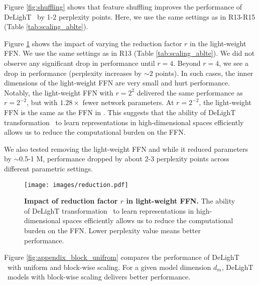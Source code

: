 \vspace{1mm}
 Figure \ref{fig:shuffling} shows that feature shuffling improves the performance of DeLighT ~by 1-2 perplexity points. Here, we use the same settings as in R13-R15 (Table \ref{tab:scaling_ablte}).

\vspace{1mm}
 Figure \ref{fig:reduction_fac} shows the impact of varying the reduction factor $r$ in the light-weight FFN. We use the same settings as in R13 (Table \ref{tab:scaling_ablte}). We did not observe any significant drop in performance until $r=4$. Beyond $r=4$, we see a drop in performance (perplexity increases by ${\sim}2$ points). In such cases, the inner dimensions of the light-weight FFN are very small and hurt performance. Notably, the light-weight FFN with $r=2^2$ delivered the same performance as $r=2^{-2}$, but with $1.28\times$ fewer network parameters. At $r=2^{-2}$, the light-weight FFN is the same as the FFN in \cite{vaswani2017attention}. This suggests that the ability of DeLighT transformation ~to learn representations in high-dimensional spaces efficiently allows us to reduce the computational burden on the FFN. 

We also tested removing the light-weight FFN and while it reduced parameters by $\sim$0.5-1 M, performance dropped by about 2-3 perplexity points across different parametric settings.

\begin{figure}[t!]
    \centering
    \texttt{[image: images/reduction.pdf]}
    \caption{\textbf{Impact of reduction factor $r$ in light-weight FFN.} The ability of DeLighT transformation ~to learn representations in high-dimensional spaces efficiently allows us to reduce the computational burden on the FFN. Lower perplexity value means better performance.}
    \label{fig:reduction_fac}
\end{figure}

\vspace{1mm}
 Figure \ref{fig:appendix_block_unifrom} compares the performance of DeLighT ~with uniform and block-wise scaling. For a given model dimension $d_m$, DeLighT ~models with block-wise scaling delivers better performance.

